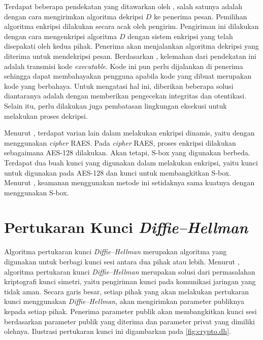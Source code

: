 Terdapat beberapa pendekatan yang ditawarkan oleh \textcite{knudsen2015}, salah satunya adalah dengan cara mengirimkan algoritma dekripsi $D$ ke penerima pesan. Pemilihan algoritma enkripsi dilakukan secara acak oleh pengirim. Pengiriman ini dilakukan dengan cara mengenkripsi algoritma $D$ dengan sistem enkripsi yang telah disepakati oleh kedua pihak. Penerima akan menjalankan algoritma dekripsi yang diterima untuk mendekripsi pesan. Berdasarkan \textcite{knudsen2015}, kelemahan dari pendekatan ini adalah transmisi kode \emph{executable}. Kode ini pun perlu dijalankan di penerima sehingga dapat membahayakan pengguna apabila kode yang dibuat merupakan kode yang berbahaya. Untuk mengatasi hal ini, diberikan beberapa solusi diantaranya adalah dengan memberikan pengecekan integritas dan otentikasi. Selain itu, perlu dilakukan juga pembatasan lingkungan eksekusi untuk melakukan proses dekripsi.

Menurut \textcite{knudsen2015}, terdapat varian lain dalam melakukan enkripsi dinamis, yaitu dengan menggunakan \emph{cipher} RAES. Pada \emph{cipher} RAES, proses enkripsi dilakukan sebagaimana AES-128 dilakukan. Akan tetapi, S-box yang digunakan berbeda. Terdapat dua buah kunci yang digunakan dalam melakukan enkripsi, yaitu kunci untuk digunakan pada AES-128 dan kunci untuk membangkitkan S-box. Menurut \textcite{knudsen2015}, keamanan menggunakan metode ini setidaknya sama kuatnya dengan menggunakan S-box.

\section{Pertukaran Kunci \emph{Diffie–Hellman}}
Algoritma pertukaran kunci \emph{Diffie–Hellman} merupakan algoritma yang digunakan untuk berbagi kunci sesi antara dua pihak atau lebih. Menurut \textcite{munir2019}, algoritma pertukaran kunci \emph{Diffie–Hellman} merupakan solusi dari permasalahan kriptografi kunci simetri, yaitu pengiriman kunci pada komunikasi jaringan yang tidak aman. Secara garis besar, setiap pihak yang akan melakukan pertukaran kunci menggunakan \emph{Diffie–Hellman}, akan mengirimkan parameter publiknya kepada setiap pihak. Penerima parameter publik akan membangkitkan kunci sesi berdasarkan parameter publik yang diterima dan parameter privat yang dimiliki olehnya. Ilustrasi pertukaran kunci ini digambarkan pada \ref{fig:crypto.dh}.

